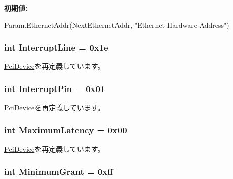 \label{classEthernet_1_1IGbE_a0a01a2a0083560db04121eeee8c8e9fe}
{\bfseries 初期値:}
\begin{DoxyCode}
Param.EthernetAddr(NextEthernetAddr,
        "Ethernet Hardware Address")
\end{DoxyCode}
\hypertarget{classEthernet_1_1IGbE_a4c885b3ef4f7d1a88903aabcce7a943e}{
\subsubsection[{InterruptLine}]{\setlength{\rightskip}{0pt plus 5cm}int {\bf InterruptLine} = 0x1e}}
\label{classEthernet_1_1IGbE_a4c885b3ef4f7d1a88903aabcce7a943e}


\hyperlink{classPci_1_1PciDevice_abfcd311da14374993f51eece70622ee4}{PciDevice}を再定義しています。\hypertarget{classEthernet_1_1IGbE_a9b18e7e4ee8e0f835496c9106eb519d5}{
\subsubsection[{InterruptPin}]{\setlength{\rightskip}{0pt plus 5cm}int {\bf InterruptPin} = 0x01}}
\label{classEthernet_1_1IGbE_a9b18e7e4ee8e0f835496c9106eb519d5}


\hyperlink{classPci_1_1PciDevice_a5b633242454258f93682fd8b05d934a1}{PciDevice}を再定義しています。\hypertarget{classEthernet_1_1IGbE_a10460b79882894b983aca9f848f4ffaf}{
\subsubsection[{MaximumLatency}]{\setlength{\rightskip}{0pt plus 5cm}int {\bf MaximumLatency} = 0x00}}
\label{classEthernet_1_1IGbE_a10460b79882894b983aca9f848f4ffaf}


\hyperlink{classPci_1_1PciDevice_a20752dfff7481059cf2d3887436800d1}{PciDevice}を再定義しています。\hypertarget{classEthernet_1_1IGbE_a1f3ebd5623021488fb0bfa84f5aa357d}{
\subsubsection[{MinimumGrant}]{\setlength{\rightskip}{0pt plus 5cm}int {\bf MinimumGrant} = 0xff}}
\label{classEthernet_1_1IGbE_a1f3ebd5623021488fb0bfa84f5aa357d}


